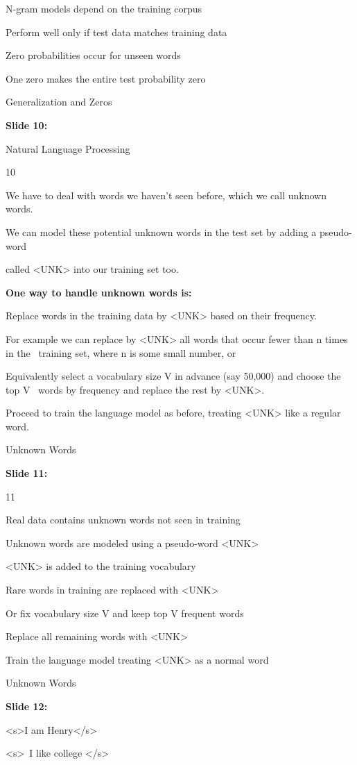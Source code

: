 \documentclass[11pt,a4paper]{article}
\begin{document}
N-gram models depend on the training corpus

Perform well only if test data matches training data

Zero probabilities occur for unseen words

One zero makes the entire test probability zero

Generalization and Zeros

\textbf{Slide 10:}

Natural Language Processing

10

We have to deal with words we haven’t seen before, which we call unknown words.

We can model these potential unknown words in the test set by adding a pseudo-word

called <UNK> into our training set too.

\textbf{One way to handle unknown words is:} 

Replace words in the training data by <UNK> based on their frequency.

For example we can replace by <UNK> all words that occur fewer than n times in the  training set, where n is some small number, or

Equivalently select a vocabulary size V in advance (say 50,000) and choose the top V  words by frequency and replace the rest by <UNK>.

Proceed to train the language model as before, treating <UNK> like a regular word.

Unknown Words

\textbf{Slide 11:}

11

Real data contains unknown words not seen in training

Unknown words are modeled using a pseudo-word <UNK>

<UNK> is added to the training vocabulary

Rare words in training are replaced with <UNK>

Or fix vocabulary size V and keep top V frequent words

Replace all remaining words with <UNK>

Train the language model treating <UNK> as a normal word

Unknown Words

\textbf{Slide 12:}

<s>I am Henry</s>

<s> I like college </s>
\end{document}

